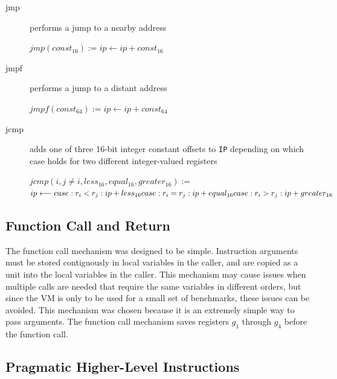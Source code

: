 \documentclass[english,a4paper,12pt]{report}
\begin{document}
\begin{description}
	\item[jmp] performs a jump to a nearby address
	
	$jmp(const_{16}) := ip \longleftarrow ip + const_{16}$ \\
	\item[jmpf] performs a jump to a distant address
	
	$jmpf(const_{64}) := ip \longleftarrow ip + const_{64}$ \\	
	
	\item[jcmp] adds one of three 16-bit integer constant offsets to
	\verb|IP| depending on which case holds for two different
	integer-valued registers
	
	$jcmp(i, j\neq i,less_{16},equal_{16},greater_{16}) :=$ \\
	$ ip \longleftarrow  \\
	case :r_{i} < r_{j}: ip + less_{16}   \\
	case :r_{i} = r_{j}: ip + equal_{16} \\
	case :r_{i} > r_{j}: ip + greater_{16}$ \\
\end{description}


\subsection{Function Call and Return}

The function call mechanism was designed to be simple. Instruction
arguments must be stored contiguously in local variables in the
caller, and are copied as a unit into the local variables in the
caller. This mechanism may cause issues when multiple calls are needed
that require the same variables in different orders, but since the VM
is only to be used for a small set of benchmarks, these issues can be
avoided. This mechanism was chosen because it is an extremely simple
way to pass arguments. The function call mechanism saves registers
$g_1$ through $g_4$ before the function call.

\subsection{Pragmatic Higher-Level Instructions}
\end{document}
